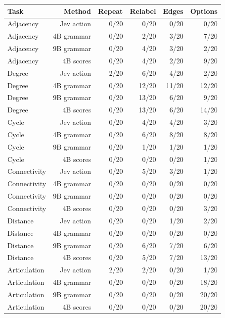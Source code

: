 \begin{tabular}{lrrrrr}
\toprule
Task & Method & Repeat & Relabel & Edges & Options \\
\midrule
Adjacency & Jev action & 0/20 & 0/20 & 0/20 & 0/20 \\
Adjacency & 4B grammar & 0/20 & 2/20 & 3/20 & 7/20 \\
Adjacency & 9B grammar & 0/20 & 4/20 & 3/20 & 2/20 \\
Adjacency & 4B scores & 0/20 & 4/20 & 2/20 & 9/20 \\
Degree & Jev action & 2/20 & 6/20 & 4/20 & 2/20 \\
Degree & 4B grammar & 0/20 & 12/20 & 11/20 & 12/20 \\
Degree & 9B grammar & 0/20 & 13/20 & 6/20 & 9/20 \\
Degree & 4B scores & 0/20 & 13/20 & 6/20 & 14/20 \\
Cycle & Jev action & 0/20 & 4/20 & 4/20 & 3/20 \\
Cycle & 4B grammar & 0/20 & 6/20 & 8/20 & 8/20 \\
Cycle & 9B grammar & 0/20 & 1/20 & 1/20 & 1/20 \\
Cycle & 4B scores & 0/20 & 0/20 & 0/20 & 1/20 \\
Connectivity & Jev action & 0/20 & 5/20 & 3/20 & 1/20 \\
Connectivity & 4B grammar & 0/20 & 0/20 & 0/20 & 0/20 \\
Connectivity & 9B grammar & 0/20 & 0/20 & 0/20 & 0/20 \\
Connectivity & 4B scores & 0/20 & 0/20 & 0/20 & 3/20 \\
Distance & Jev action & 0/20 & 0/20 & 1/20 & 2/20 \\
Distance & 4B grammar & 0/20 & 0/20 & 0/20 & 0/20 \\
Distance & 9B grammar & 0/20 & 6/20 & 7/20 & 6/20 \\
Distance & 4B scores & 0/20 & 5/20 & 7/20 & 13/20 \\
Articulation & Jev action & 2/20 & 2/20 & 0/20 & 1/20 \\
Articulation & 4B grammar & 0/20 & 0/20 & 0/20 & 18/20 \\
Articulation & 9B grammar & 0/20 & 0/20 & 0/20 & 20/20 \\
Articulation & 4B scores & 0/20 & 0/20 & 0/20 & 20/20 \\
\bottomrule
\end{tabular}

